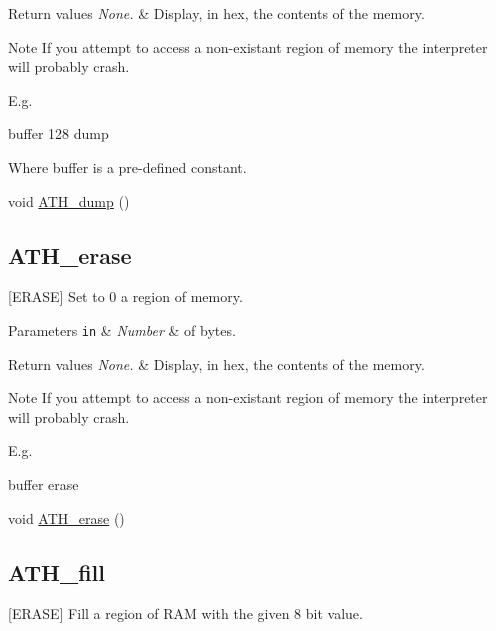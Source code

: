 \begin{DoxyRetVals}{Return values}
{\em None.} & Display, in hex, the contents of the memory.\\
\hline
\end{DoxyRetVals}
\begin{DoxyNote}{Note}
If you attempt to access a non-\/existant region of memory the interpreter will probably crash.
\end{DoxyNote}

\begin{DoxyCode}
E.g.

buffer 128 dump
\end{DoxyCode}


Where buffer is a pre-\/defined constant.



 \begin{DoxyCompactItemize}
\item 
void \hyperlink{group__FileUrilities_ga2ad12d2555007300089d9072e6de2abf}{A\+T\+H\+\_\+dump} ()
\end{DoxyCompactItemize}
\subsection*{A\+T\+H\+\_\+erase}
\label{_amgrpe5e318abffd38750c6838708ab1e7f1e}%
\mbox{[}E\+R\+A\+SE\mbox{]} Set to 0 a region of memory.


\begin{DoxyParams}[1]{Parameters}
\mbox{\tt in}  & {\em Number} & of bytes.\\
\hline
\end{DoxyParams}

\begin{DoxyRetVals}{Return values}
{\em None.} & Display, in hex, the contents of the memory.\\
\hline
\end{DoxyRetVals}
\begin{DoxyNote}{Note}
If you attempt to access a non-\/existant region of memory the interpreter will probably crash.
\end{DoxyNote}
E.\+g.

buffer erase



 \begin{DoxyCompactItemize}
\item 
void \hyperlink{group__FileUrilities_ga41d39e0bc8285a793b78ca6c6a254094}{A\+T\+H\+\_\+erase} ()
\end{DoxyCompactItemize}
\subsection*{A\+T\+H\+\_\+fill}
\label{_amgrp895e7b34d52d131e20e1f804e9b188c4}%
\mbox{[}E\+R\+A\+SE\mbox{]} Fill a region of R\+AM with the given 8 bit value.


